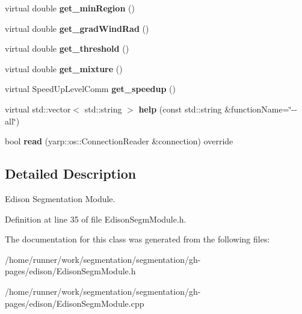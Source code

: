 \begin{DoxyCompactItemize}
\mbox{\label{classEdisonSegmModule_ad61a5ccea53f415be9f2b76a8781689f}} 
virtual double {\bfseries get\+\_\+min\+Region} ()
\item 
\mbox{\label{classEdisonSegmModule_ab9ce5f24dd33f58d543b25ec0257af41}} 
virtual double {\bfseries get\+\_\+grad\+Wind\+Rad} ()
\item 
\mbox{\label{classEdisonSegmModule_a8e3ab7941df516f42357330a80d1e408}} 
virtual double {\bfseries get\+\_\+threshold} ()
\item 
\mbox{\label{classEdisonSegmModule_a58df44d5dbba062170e5e22f957da907}} 
virtual double {\bfseries get\+\_\+mixture} ()
\item 
\mbox{\label{classEdisonSegmModule_ae1f22b6113534640a3faedd22505932b}} 
virtual Speed\+Up\+Level\+Comm {\bfseries get\+\_\+speedup} ()
\item 
\mbox{\label{classSegmentationModule_af5e7c395d563e6c9b170d509c2a01e0a}} 
virtual std\+::vector$<$ std\+::string $>$ {\bfseries help} (const std\+::string \&function\+Name=\char`\"{}-\/-\/all\char`\"{})
\item 
\mbox{\label{classSegmentationModule_a23b0718c2744b9f9a028a182a578f5b7}} 
bool {\bfseries read} (yarp\+::os\+::\+Connection\+Reader \&connection) override
\end{DoxyCompactItemize}


\subsection{Detailed Description}
Edison Segmentation Module. 



Definition at line 35 of file Edison\+Segm\+Module.\+h.



The documentation for this class was generated from the following files\+:\begin{DoxyCompactItemize}
\item 
/home/runner/work/segmentation/segmentation/gh-\/pages/edison/Edison\+Segm\+Module.\+h\item 
/home/runner/work/segmentation/segmentation/gh-\/pages/edison/Edison\+Segm\+Module.\+cpp\end{DoxyCompactItemize}
